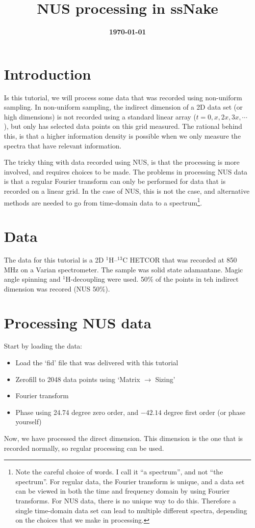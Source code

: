 \documentclass[11pt,a4paper]{article}
\title{\color{black}\fontfamily{SourceSansPro-LF}\bfseries NUS processing in ssNake}
\author{}
\date{\color{black}\fontfamily{SourceSansPro-LF}\bfseries \today}
\begin{document}

\maketitle

\section{Introduction}
Is this tutorial, we will process some data that was recorded using non-uniform
sampling. In non-uniform sampling, the indirect dimension of a 2D data set (or
high dimensions) is not recorded using a standard linear array ($t =
0,x,2x,3x,\cdots$), but only has selected data points on this grid measured. The
rational behind this, is that a higher information density is possible when we
only measure the spectra that have relevant information. 

The tricky thing with data recorded using NUS, is that the processing is more
involved, and requires choices to be made. The problems in processing NUS data
is that a regular Fourier transform can only be performed for data that is
recorded on a linear grid. In the case of NUS, this is not the case, and
alternative methods are needed to go from time-domain data to a
spectrum\footnote{Note the careful choice of words. I call it ``a
spectrum'', and not ``the spectrum''. For regular data, the Fourier transform
is unique, and a data set can be viewed in both the time and frequency domain by
using Fourier transforms. For NUS data, there is no unique way to do this.
Therefore a single time-domain data set can lead to multiple different spectra,
depending on the choices that we make in processing.}.


\section{Data}
The data for this tutorial is a 2D $^1$H--$^{13}$C HETCOR that was recorded at 850 MHz on a
Varian spectrometer.  The sample was solid state adamantane. Magic angle spinning
and $^1$H-decoupling were used. 50\% of the points in teh indirect dimension was recored (NUS 50\%).

\section{Processing NUS data}
Start by loading the data:
\begin{itemize}
  \item Load the `fid' file that was delivered with this tutorial
  \item Zerofill to 2048 data points using `Matrix $\longrightarrow$ Sizing'
  \item Fourier transform
  \item Phase using 24.74 degree zero order, and $-42.14$ degree first order (or
	 phase yourself)
\end{itemize}
Now, we have processed the direct dimension. This dimension is the one that is
recorded normally, so regular processing can be used.
\end{document}
